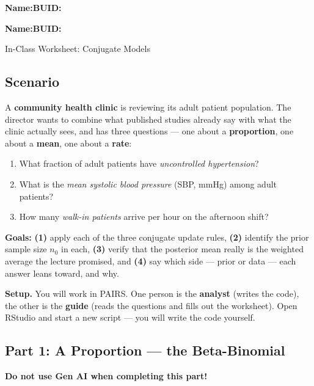 \documentclass{article}
\newcommand{\blankline}[1]{\underline{\hspace{#1}}}
\begin{document}
\noindent\textbf{Name:}\blankline{2.25in}\hfill\textbf{BUID:}\blankline{1.55in}

\medskip

\noindent\textbf{Name:}\blankline{2.25in}\hfill\textbf{BUID:}\blankline{1.55in}\newline

\begin{center}
 \Large In-Class Worksheet: Conjugate Models
\end{center}

\subsection*{Scenario}
A \textbf{community health clinic} is reviewing its adult patient population. The director wants to combine what published studies already say with what the clinic actually sees, and has three questions --- one about a \textbf{proportion}, one about a \textbf{mean}, one about a \textbf{rate}:

\begin{enumerate}[label={\bfseries \arabic*.},topsep=2pt,itemsep=2pt]
	\item What fraction of adult patients have \emph{uncontrolled hypertension}?
	\item What is the \emph{mean systolic blood pressure} (SBP, mmHg) among adult patients?
	\item How many \emph{walk-in patients} arrive per hour on the afternoon shift?
\end{enumerate}

\medskip
\noindent\textbf{Goals:}
\textbf{(1)} apply each of the three conjugate update rules,
\textbf{(2)} identify the prior sample size $n_0$ in each,
\textbf{(3)} verify that the posterior mean really is the weighted average the lecture promised, and
\textbf{(4)} say which side --- prior or data --- each answer leans toward, and why.

\medskip
\noindent\textbf{Setup.} You will work in PAIRS. One person is the \textbf{analyst} (writes the code), the other is the \textbf{guide} (reads the questions and fills out the worksheet). Open RStudio and start a new script --- you will write the code yourself.

\subsection*{Part 1: A Proportion --- the Beta-Binomial}
\textbf{\color{red} Do not use Gen AI when completing this part!}
\end{document}
